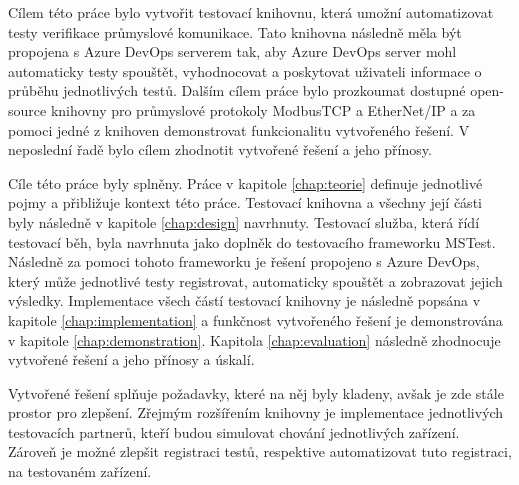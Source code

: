 \begin{conclusion}
Cílem této práce bylo vytvořit testovací knihovnu, která umožní automatizovat testy verifikace průmyslové komunikace. Tato knihovna následně měla být propojena s Azure DevOps serverem tak, aby Azure DevOps server mohl automaticky testy spouštět, vyhodnocovat a poskytovat uživateli informace o průběhu jednotlivých testů. Dalším cílem práce bylo prozkoumat dostupné open-source knihovny pro průmyslové protokoly ModbusTCP a EtherNet/IP a za pomoci jedné z knihoven demonstrovat funkcionalitu vytvořeného řešení. V neposlední řadě bylo cílem zhodnotit vytvořené řešení a jeho přínosy.

Cíle této práce byly splněny. Práce v kapitole \ref{chap:teorie} definuje jednotlivé pojmy a přibližuje kontext této práce. Testovací knihovna a všechny její části byly následně v kapitole \ref{chap:design} navrhnuty. Testovací služba, která řídí testovací běh, byla navrhnuta jako doplněk do testovacího frameworku MSTest. Následně za pomoci tohoto frameworku je řešení propojeno s Azure DevOps, který může jednotlivé testy registrovat, automaticky spouštět a zobrazovat jejich výsledky. Implementace všech částí testovací knihovny je následně popsána v kapitole \ref{chap:implementation} a funkčnost vytvořeného řešení je demonstrována v kapitole \ref{chap:demonstration}. Kapitola \ref{chap:evaluation} následně zhodnocuje vytvořené řešení a jeho přínosy a úskalí. 

Vytvořené řešení splňuje požadavky, které na něj byly kladeny, avšak je zde stále prostor pro zlepšení. Zřejmým rozšířením knihovny je implementace jednotlivých testovacích partnerů, kteří budou simulovat chování jednotlivých zařízení. Zároveň je možné zlepšit registraci testů, respektive automatizovat tuto registraci, na testovaném zařízení. 
\end{conclusion}